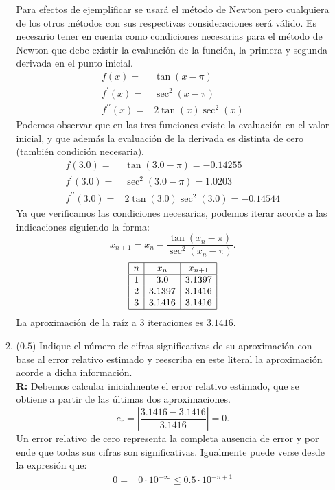 \documentclass[12pt]{article}
\begin{document}
\begin{enumerate}[leftmargin=*,widest=9]
\begin{enumerate}[label=\alph*]
	 Para efectos de ejemplificar se usará el método de Newton pero cualquiera de los otros métodos con sus respectivas consideraciones será válido. Es necesario tener en cuenta como condiciones necesarias para el método de Newton que debe existir la evaluación de la función, la primera y segunda derivada en el punto inicial.\\
	 \begin{eqnarray*}
	 f(x) = & \tan(x-\pi)\\
	 f^{\prime}(x) = & \sec^2(x - \pi)\\
	 f^{\prime\prime}(x) = &2\tan(x)\sec^2(x)
	 \end{eqnarray*}
	 Podemos observar que en las tres funciones existe la evaluación en el valor inicial, y que además la evaluación de la derivada es distinta de cero (también condición necesaria).
	 \begin{eqnarray*}
	 f(3.0) = & \tan(3.0-\pi) =-0.14255 \\
	 f^{\prime}(3.0) = & \sec^2(3.0 - \pi)=1.0203\\
	 f^{\prime\prime}(3.0) = &2\tan(3.0)\sec^2(3.0)=-0.14544
	 \end{eqnarray*}
	 Ya que verificamos las condiciones necesarias, podemos iterar acorde a las indicaciones siguiendo la forma: \[x_{n+1} = x_n - \frac{\tan(x_n - \pi)}{\sec^2(x_n - \pi)}.\]
\[
	 \begin{array}{|c|c|c|}
	 \hline
	 n & x_n & x_{n+1}\\
	 \hline
	 1 & 3.0 & 3.1397\\
	 2 & 3.1397 & 3.1416\\
	 3 & 3.1416 & 3.1416\\
	 \hline
	 \end{array}
	 \]
   La aproximación de la raíz a 3 iteraciones es \(3.1416\).
   \item (\(0.5\)) Indique el número de cifras significativas de su aproximación con base al error relativo estimado y reescriba en este literal la aproximación acorde a dicha información.\\
	 \textbf{R:} Debemos calcular inicialmente el error relativo estimado, que se obtiene a partir de las últimas dos aproximaciones.
	 \[ e_r = \left\vert \frac{3.1416 - 3.1416}{3.1416} \right\vert = 0. \]
	 Un error relativo de cero representa la completa ausencia de error y por ende que todas sus cifras son significativas.
	 Igualmente puede verse desde la expresión que:
	 \begin{eqnarray*}
	 0 = &0 \cdot 10^{-\infty} \leq 0.5 \cdot 10^{-n+1}\\

\end{eqnarray*}
\end{enumerate}
\end{enumerate}
\end{document}
